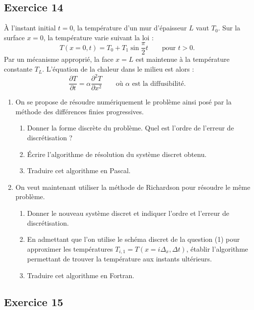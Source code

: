 \subsection*{Exercice 14}

À l'instant initial $t = 0$, la température d'un mur d'épaisseur $L$ vaut
$T_0$. Sur la surface $x = 0$, la température varie suivant la loi :
\[
  T(x = 0, t) = T_0 + T_1\sin\frac{\pi}{2}t \qquad\text{pour } t > 0 .
\]
Par un mécanisme approprié, la face $x = L$ est maintenue à la température
constante $T_L$. L'équation de la chaleur dans le milieu est alors :
\[
  \frac{\partial T}{\partial t} = \alpha\frac{\partial^2 T}{\partial x^2}
  \qquad\text{où } \alpha \text{ est la diffusibilité.}
\]
\begin{enumerate}[label=\arabic*)-]
  \item On se propose de résoudre numériquement le problème ainsi posé par la
        méthode des différences finies progressives.
        \begin{enumerate}[label=\alph*)-]
          \item Donner la forme discrète du problème. Quel est l'ordre de
                l'erreur de discrétisation ?
          \item Écrire l'algorithme de résolution du système discret obtenu.
          \item Traduire cet algorithme en Pascal.
        \end{enumerate}
  \item On veut maintenant utiliser la méthode de Richardson pour résoudre le
        même problème.
        \begin{enumerate}[label=\alph*)-]
          \item Donner le nouveau système discret et indiquer l'ordre et
                l'erreur de discrétisation.
          \item En admettant que l'on utilise le schéma discret de la question
                (1) pour approximer les températures
                $T_{i,1} = T(x = i\Delta_x, \Delta t)$, établir l'algorithme
                permettant de trouver la température aux instants ultérieurs.
          \item Traduire cet algorithme en Fortran.
        \end{enumerate}
\end{enumerate}

\subsection*{Exercice 15}

